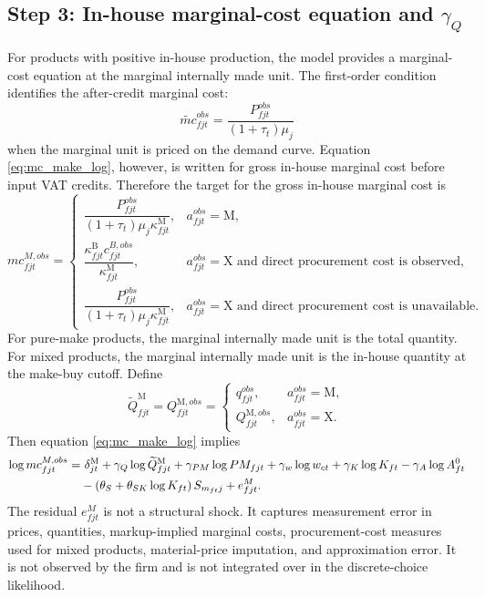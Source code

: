 \documentclass[11pt,a4paper]{article}
\newcommand{\M}{\mathrm{M}}
\newcommand{\B}{\mathrm{B}}
\newcommand{\X}{\mathrm{X}}
\begin{document}
\subsection{Step 3: In-house marginal-cost equation and \texorpdfstring{$\gamma_Q$}{gamma Q}}

For products with positive in-house production, the model provides a marginal-cost equation at the marginal internally made unit. The first-order condition identifies the after-credit marginal cost:
\begin{equation}
    \widetilde{mc}^{obs}_{fjt}=\frac{P^{obs}_{fjt}}{(1+\tau_t)\mu_j}
    \label{eq:effective_mc_target}
\end{equation}
when the marginal unit is priced on the demand curve. Equation \eqref{eq:mc_make_log}, however, is written for gross in-house marginal cost before input VAT credits. Therefore the target for the gross in-house marginal cost is
\begin{equation}
    mc^{M,obs}_{fjt}= 
    \begin{cases}
        \dfrac{P^{obs}_{fjt}}{(1+\tau_t)\mu_j\kappa^{\M}_{fjt}}, & a^{obs}_{fjt}=\M,\\[1.0em]
        \dfrac{\kappa^{\B}_{fjt}c^{B,obs}_{fjt}}{\kappa^{\M}_{fjt}}, & a^{obs}_{fjt}=\X\text{ and direct procurement cost is observed},\\[1.0em]
        \dfrac{P^{obs}_{fjt}}{(1+\tau_t)\mu_j\kappa^{\M}_{fjt}}, & a^{obs}_{fjt}=\X\text{ and direct procurement cost is unavailable}.
    \end{cases}
    \label{eq:mc_target}
\end{equation}
For pure-make products, the marginal internally made unit is the total quantity. For mixed products, the marginal internally made unit is the in-house quantity at the make-buy cutoff. Define
\begin{equation}
    \widetilde Q^{\M}_{fjt}=Q^{\M,obs}_{fjt}
    =\begin{cases}
        q^{obs}_{fjt}, & a^{obs}_{fjt}=\M,\\
        Q^{\M,obs}_{fjt}, & a^{obs}_{fjt}=\X.
    \end{cases}
    \label{eq:Qtilde}
\end{equation}
Then equation \eqref{eq:mc_make_log} implies
\begin{align}
    \log mc^{M,obs}_{fjt}
    =&\ \delta^{\M}_{jt}
    +\gamma_Q\log \widetilde Q^{\M}_{fjt}
    +\gamma_{PM}\log PM_{fjt}
    +\gamma_w\log w_{ct}
    +\gamma_K\log K_{ft}
    -\gamma_A\log A^0_{ft} \notag\\
    &-\left(\theta_S+\theta_{SK}\log K_{ft}\right)S_{m_{ft}j}
    +e^M_{fjt}.
    \label{eq:make_cost_empirical}
\end{align}
The residual $e^M_{fjt}$ is not a structural shock. It captures measurement error in prices, quantities, markup-implied marginal costs, procurement-cost measures used for mixed products, material-price imputation, and approximation error. It is not observed by the firm and is not integrated over in the discrete-choice likelihood.
\end{document}
